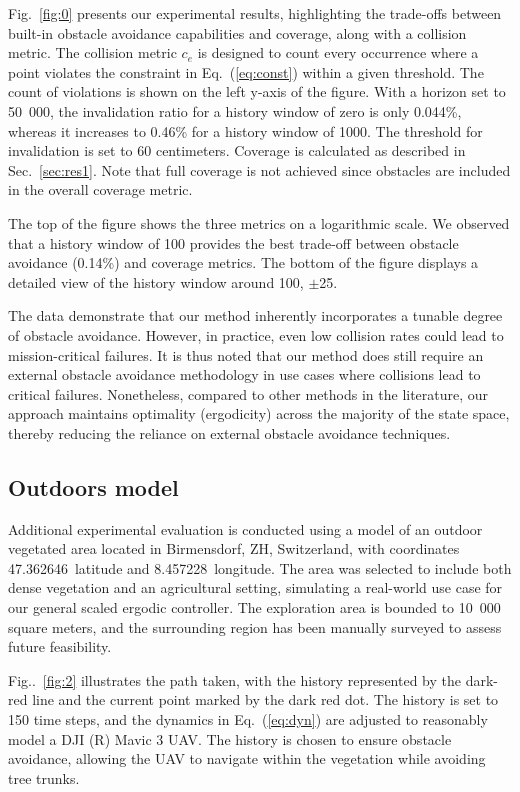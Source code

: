 \documentclass[letterpaper,10pt,conference,twoside]{IEEEtran}
\theoremstyle{definition}
\begin{document}
Fig.~\ref{fig:0} presents our experimental results, highlighting the trade-offs between built-in obstacle avoidance capabilities and coverage, along with a collision metric. The collision metric $c_e$ is designed to count every occurrence where a point violates the constraint in Eq.~(\ref{eq:const}) within a given threshold. The count of violations is shown on the left y-axis of the figure. With a horizon set to 50~000, the invalidation ratio for a history window of zero is only 0.044\%, whereas it increases to 0.46\% for a history window of 1000. The threshold for invalidation is set to 60 centimeters. Coverage is calculated as described in Sec.~\ref{sec:res1}. Note that full coverage is not achieved since obstacles are included in the overall coverage metric.

The top of the figure shows the three metrics on a logarithmic scale. We observed that a history window of 100 provides the best trade-off between obstacle avoidance (0.14\%) and coverage metrics. The bottom of the figure displays a detailed view of the history window around 100, $\pm$25.

The data demonstrate that our method inherently incorporates a tunable degree of obstacle avoidance. However, in practice, even low collision rates could lead to mission-critical failures. It is thus noted that our method does still require an external obstacle avoidance methodology in use cases where collisions lead to critical failures. Nonetheless, compared to other methods in the literature, our approach maintains optimality (ergodicity) across the majority of the state space, thereby reducing the reliance on external obstacle avoidance techniques.

\subsection{Outdoors model}\label{sec:res3}
\noindent
Additional experimental evaluation is conducted using a model of an outdoor vegetated area located in Birmensdorf, ZH, Switzerland, with coordinates 47.362646\textdegree~latitude and 8.457228\textdegree~longitude. The area was selected to include both dense vegetation and an agricultural setting, simulating a real-world use case for our general scaled ergodic controller. The exploration area is bounded to 10~000 square meters, and the surrounding region has been manually surveyed to assess future feasibility.

Fig..~\ref{fig:2} illustrates the path taken, with the history represented by the dark-red line and the current point marked by the dark red dot. The history is set to 150 time steps, and the dynamics in Eq.~(\ref{eq:dyn}) are adjusted to reasonably model a DJI (R) Mavic 3 UAV. The history is chosen to ensure obstacle avoidance, allowing the UAV to navigate within the vegetation while avoiding tree trunks.
\end{document}
